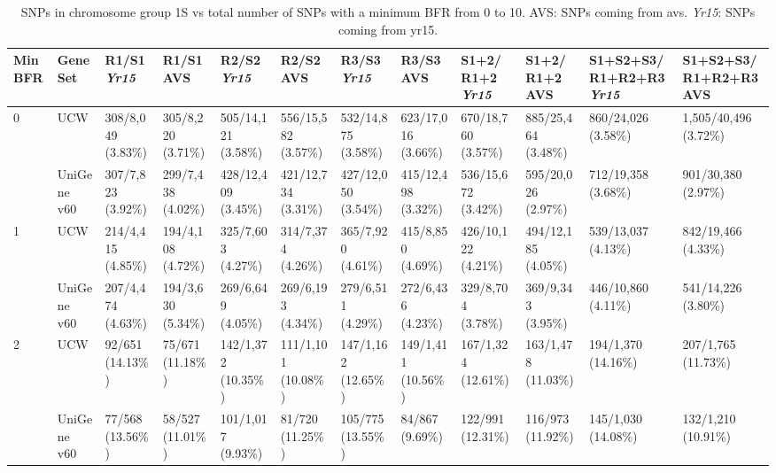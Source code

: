 \begin{sidewaystable}
\caption{ SNPs in chromosome group 1S vs total number of SNPs with a minimum BFR from 0 to 10. AVS: SNPs coming from \acrlong{avs}. \textit{Yr15}: SNPs coming from \acrlong{yr15}. }
\centering
\label{app:yr15:bfrThresholds}
\begin{localsize}{6}{7}

\begin{tabular}{llp{1cm}p{1cm}p{1cm}p{1cm}p{1cm}p{1cm}p{1cm}p{1cm}p{1cm}p{1cm}}
\toprule
 Min  BFR   & Gene Set    & R1/S1 \textit{Yr15}        & R1/S1 AVS         & R2/S2 \textit{Yr15}         & R2/S2 AVS          & R3/S3 \textit{Yr15}         & R3/S3 AVS          & S1+2/ R1+2 \textit{Yr15}    & S1+2/ R1+2 AVS     & S1+S2+S3/ R1+R2+R3 \textit{Yr15}   & S1+S2+S3/ R1+R2+R3 AVS   \\
\midrule
 0          & UCW         & 308/8,049 (3.83\%) & 305/8,220 (3.71\%) & 505/14,121 (3.58\%) & 556/15,582 (3.57\%) & 532/14,875 (3.58\%) & 623/17,016 (3.66\%) & 670/18,760 (3.57\%) & 885/25,464 (3.48\%) & 860/24,026 (3.58\%)        & 1,505/40,496 (3.72\%)     \\
            & UniGene v60 & 307/7,823 (3.92\%) & 299/7,438 (4.02\%) & 428/12,409 (3.45\%) & 421/12,734 (3.31\%) & 427/12,050 (3.54\%) & 415/12,498 (3.32\%) & 536/15,672 (3.42\%) & 595/20,026 (2.97\%) & 712/19,358 (3.68\%)        & 901/30,380 (2.97\%)       \\
 \midrule
 1          & UCW         & 214/4,415 (4.85\%) & 194/4,108 (4.72\%) & 325/7,603 (4.27\%)  & 314/7,374 (4.26\%)  & 365/7,920 (4.61\%)  & 415/8,850 (4.69\%)  & 426/10,122 (4.21\%) & 494/12,185 (4.05\%) & 539/13,037 (4.13\%)        & 842/19,466 (4.33\%)       \\
            & UniGene v60 & 207/4,474 (4.63\%) & 194/3,630 (5.34\%) & 269/6,649 (4.05\%)  & 269/6,193 (4.34\%)  & 279/6,511 (4.29\%)  & 272/6,436 (4.23\%)  & 329/8,704 (3.78\%)  & 369/9,343 (3.95\%)  & 446/10,860 (4.11\%)        & 541/14,226 (3.80\%)       \\
 \midrule
 2          & UCW         & 92/651 (14.13\%)   & 75/671 (11.18\%)   & 142/1,372 (10.35\%) & 111/1,101 (10.08\%) & 147/1,162 (12.65\%) & 149/1,411 (10.56\%) & 167/1,324 (12.61\%) & 163/1,478 (11.03\%) & 194/1,370 (14.16\%)        & 207/1,765 (11.73\%)       \\
            & UniGene v60 & 77/568 (13.56\%)   & 58/527 (11.01\%)   & 101/1,017 (9.93\%)  & 81/720 (11.25\%)    & 105/775 (13.55\%)   & 84/867 (9.69\%)     & 122/991 (12.31\%)   & 116/973 (11.92\%)   & 145/1,030 (14.08\%)        & 132/1,210 (10.91\%)       \\

\end{tabular}
\end{localsize}
\end{sidewaystable}

